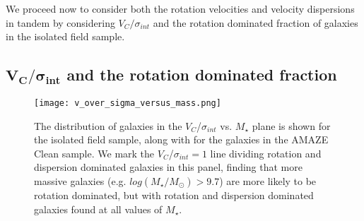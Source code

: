 \documentclass[fleqn,usenatbib]{mn2e}
\begin{document}
We proceed now to consider both the rotation velocities and velocity dispersions in tandem by considering $V_{C}/\sigma_{int}$ and the rotation dominated fraction of galaxies in the isolated field sample.


\subsection{$\boldsymbol{V_{C}/\sigma_{int}}$ and the rotation dominated fraction}\label{subsec:rdf_v_over_sigma}

\begin{figure}
    \centering \hspace{-1.13cm}
    \texttt{[image: v\_over\_sigma\_versus\_mass.png]}
    \caption{The distribution of galaxies in the $V_{C}$/$\sigma_{int}$ vs. $M_{\star}$ plane is shown for the isolated field sample, along with for the galaxies in the AMAZE Clean sample.
    We mark the $V_{C}$/$\sigma_{int}=1$ line dividing rotation and dispersion dominated galaxies in this panel, finding that more massive galaxies (e.g. $log(M_{\star}/M_{\odot}) > 9.7$) are more likely to be rotation dominated, but with rotation and dispersion dominated galaxies found at all values of $M_{\star}$.}
    \label{fig:v_sig_and_v}
\end{figure}
\end{document}
